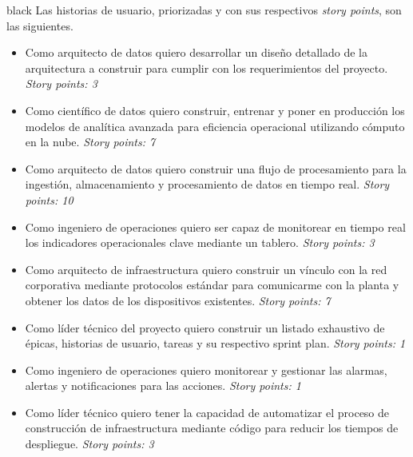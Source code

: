 \documentclass[11pt]{charter}
\begin{document}
\begin{consigna}{black}
Las historias de usuario, priorizadas y con sus respectivos \textit{story points}, son las siguientes.

\begin{itemize}
\item Como arquitecto de datos quiero desarrollar un diseño detallado de la arquitectura a construir para cumplir con los requerimientos del proyecto. \textit{Story points: 3}
\item Como científico de datos quiero construir, entrenar y poner en producción los modelos de analítica avanzada para eficiencia operacional utilizando cómputo en la nube. \textit{Story points: 7}
\item Como arquitecto de datos quiero construir una flujo de procesamiento para la ingestión, almacenamiento y procesamiento de datos en tiempo real. \textit{Story points: 10}
\item Como ingeniero de operaciones quiero ser capaz de monitorear en tiempo real los indicadores operacionales clave mediante un tablero. \textit{Story points: 3}
\item Como arquitecto de infraestructura quiero construir un vínculo con la red corporativa mediante protocolos estándar para comunicarme con la planta y obtener los datos de los dispositivos existentes. \textit{Story points: 7}
\item Como líder técnico del proyecto quiero construir un listado exhaustivo de épicas, historias de usuario, tareas y su respectivo sprint plan. \textit{Story points: 1}
\item Como ingeniero de operaciones quiero monitorear y gestionar las alarmas, alertas y notificaciones para las acciones. \textit{Story points: 1}

\item Como líder técnico quiero tener la capacidad de automatizar el proceso de construcción de infraestructura mediante código para reducir los tiempos de despliegue. \textit{Story points: 3}
\end{itemize}

\end{consigna}
\end{document}
